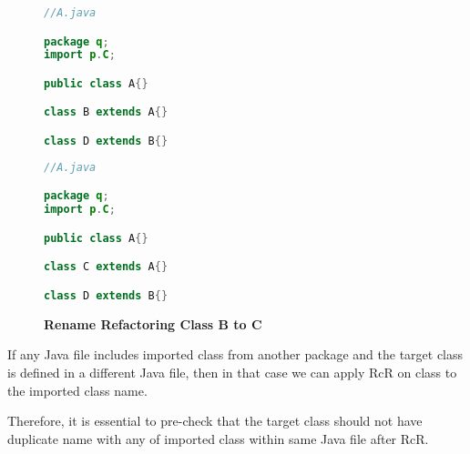 \begin{figure}[th]
\centering
\begin{minipage}[t]{0.45\linewidth}
\begin{lstlisting}[language=java, basicstyle=\scriptsize\ttfamily,frame=single]	
//A.java

package q;
import p.C;

public class A{}

class B extends A{}

class D extends B{}
\end{lstlisting}
\end{minipage}
\hfill
\begin{minipage}[t]{0.45\linewidth}
\begin{lstlisting}[language=java, basicstyle=\scriptsize\ttfamily,frame=single]
//A.java

package q;
import p.C;

public class A{}

class C extends A{}

class D extends B{}	
\end{lstlisting}
\end{minipage}
\caption{\textbf{Rename Refactoring Class B to C}}
\label{figure:figpc3_1}
\end{figure}

If any Java file includes imported class from another package and the target class is defined in a different Java file, then in that case we can apply RcR on class to the imported class name.

Therefore, it is essential to pre-check that the target class should not have duplicate name with any of imported class within same Java file after RcR.

